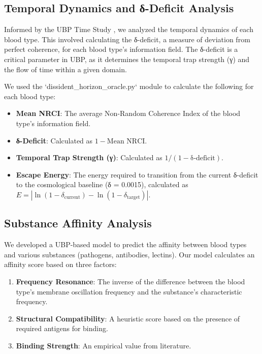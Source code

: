 \documentclass{article}
\begin{document}
\subsection{Temporal Dynamics and δ-Deficit Analysis}

Informed by the UBP Time Study \cite{time_study}, we analyzed the temporal dynamics of each blood type. This involved calculating the δ-deficit, a measure of deviation from perfect coherence, for each blood type's information field. The δ-deficit is a critical parameter in UBP, as it determines the temporal trap strength (γ) and the flow of time within a given domain.

We used the `dissident_horizon_oracle.py` module to calculate the following for each blood type:

\begin{itemize}
    \item \textbf{Mean NRCI}: The average Non-Random Coherence Index of the blood type's information field.
    \item \textbf{δ-Deficit}: Calculated as $1 - \text{Mean NRCI}$.
    \item \textbf{Temporal Trap Strength (γ)}: Calculated as $1 / (1 - \text{δ-deficit})$.
    \item \textbf{Escape Energy}: The energy required to transition from the current δ-deficit to the cosmological baseline (δ = 0.0015), calculated as $E = |\ln(1 - \delta_{\text{current}}) - \ln(1 - \delta_{\text{target}})|$.
\end{itemize}

\subsection{Substance Affinity Analysis}

We developed a UBP-based model to predict the affinity between blood types and various substances (pathogens, antibodies, lectins). Our model calculates an affinity score based on three factors:

\begin{enumerate}
    \item \textbf{Frequency Resonance}: The inverse of the difference between the blood type's membrane oscillation frequency and the substance's characteristic frequency.
    \item \textbf{Structural Compatibility}: A heuristic score based on the presence of required antigens for binding.
    \item \textbf{Binding Strength}: An empirical value from literature.
\end{enumerate}
\end{document}
